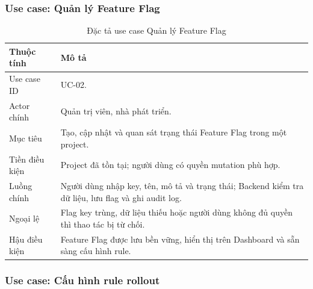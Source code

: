 \subsubsection{Use case: Quản lý Feature Flag}

\begin{table}[H]
    \centering
    \caption{Đặc tả use case Quản lý Feature Flag}
    \label{tab:uc-manage-flag}
    \begin{tabular}{p{} p{}}
        \toprule
        \textbf{Thuộc tính} & \textbf{Mô tả} \\
        \midrule
        Use case ID & UC-02. \\
        Actor chính & Quản trị viên, nhà phát triển. \\
        Mục tiêu & Tạo, cập nhật và quan sát trạng thái Feature Flag trong một project. \\
        Tiền điều kiện & Project đã tồn tại; người dùng có quyền mutation phù hợp. \\
        Luồng chính & Người dùng nhập key, tên, mô tả và trạng thái; Backend kiểm tra dữ liệu, lưu flag và ghi audit log. \\
        Ngoại lệ & Flag key trùng, dữ liệu thiếu hoặc người dùng không đủ quyền thì thao tác bị từ chối. \\
        Hậu điều kiện & Feature Flag được lưu bền vững, hiển thị trên Dashboard và sẵn sàng cấu hình rule. \\
        \bottomrule
    \end{tabular}
\end{table}

\subsubsection{Use case: Cấu hình rule rollout}

